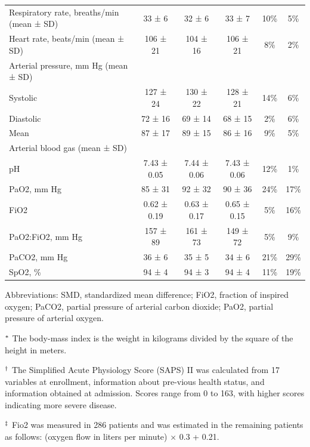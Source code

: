 \documentclass{article}
\begin{document}
\begin{center}
\begin{table}[!ht]
\begin{tabular*}{\textwidth}{@{\extracolsep\fill}lccccc@{}}
Respiratory rate, breaths/min (mean ± SD) & 33 ± 6 & 32 ± 6 & 33 ± 7 & 10\% & 5\% \\
Heart rate,  beats/min (mean ± SD) & 106 ± 21 & 104 ± 16 & 106 ± 21 & 8\%  & 2\% \\
Arterial pressure, mm Hg (mean ± SD) &  &  &  \\
\hspace{5mm}Systolic & 127 ± 24 & 130 ± 22 & 128 ± 21 & 14\% & 6\% \\
\hspace{5mm}Diastolic & 72 ± 16 & 69 ± 14 & 68 ± 15 & 2\% & 6\% \\
\hspace{5mm}Mean & 87 ± 17 & 89 ± 15 & 86 ± 16 & 9\%  & 5\% \\
Arterial blood gas (mean ± SD) &  &  &  \\
\hspace{5mm}pH & 7.43 ± 0.05 & 7.44 ± 0.06 & 7.43 ± 0.06 & 12\% & 1\%  \\
\hspace{5mm}PaO2, mm Hg & 85 ± 31 & 92 ± 32 & 90 ± 36 & 24\% & 17\%  \\
\hspace{5mm}FiO2\tnote{$^\ddagger$} & 0.62 ± 0.19 & 0.63 ± 0.17 & 0.65 ± 0.15 & 5\% & 16\%  \\
\hspace{5mm}PaO2:FiO2, mm Hg & 157 ± 89 & 161 ± 73 & 149 ± 72 & 5\% & 9\% \\
\hspace{5mm}PaCO2, mm Hg & 36 ± 6 & 35 ± 5 & 34 ± 6 & 21\% & 29\% \\
\hspace{5mm}SpO2, \% & 94 ± 4 & 94 ± 3 & 94 ± 4 & 11\% & 19\% \\
\bottomrule
\end{tabular*}
\begin{tablenotes}%
\item[Abbreviations:] SMD, standardized mean difference; FiO2, fraction of inspired oxygen; PaCO2, partial pressure of arterial carbon dioxide; PaO2, partial pressure of arterial oxygen.
\item[$^{\rm *}$]	The body-mass index is the weight in kilograms divided by the square of the height in meters.
\item[$^{\rm \dagger}$]	The Simplified Acute Physiology Score (SAPS) II was calculated from 17 variables at enrollment, information about pre-vious health status, and information obtained at admission. Scores range from 0 to 163, with higher scores indicating more severe disease.
\item[$^{\rm \ddagger}$]	Fio2 was measured in 286 patients and was estimated in the remaining patients as follows: (oxygen flow in liters per minute) × 0.3 + 0.21.
\end{tablenotes}
\end{table}
\end{center}
\end{document}

